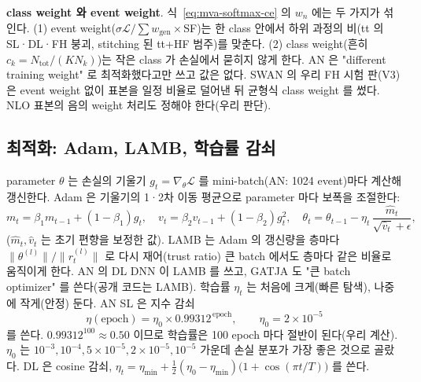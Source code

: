 \textbf{class weight 와 event weight}.\label{sec:mva-basics-weights} 식~\eqref{eq:mva-softmax-ce} 의 $w_n$ 에는 두 가지가 섞인다. (1) event weight($\sigma\mathcal{L}/\sum w_{\mathrm{gen}}\times$SF)는 한 class 안에서
하위 과정의 비(tt 의 SL·DL·FH 붕괴, stitching 된 tt+HF 범주)를 맞춘다. (2) class weight(흔히 $c_k=N_{\mathrm{tot}}/(K N_k)$)는 작은 class 가
손실에서 묻히지 않게 한다. AN 은 "different training weight" 로 최적화했다고만 쓰고 값은 없다. SWAN 의 우리 FH
시험 판(V3)은 event weight 없이 표본을 일정 비율로 덜어낸 뒤 균형식 class weight 를 썼다. NLO 표본의 음의 weight 처리도
정해야 한다(우리 판단).

\subsection{최적화: Adam, LAMB, 학습률 감쇠}\label{sec:mva-basics-opt}

parameter $\theta$ 는 손실의 기울기 $g_t=\nabla_\theta\mathcal{L}$ 를 mini-batch(AN: 1024 event)마다 계산해 갱신한다. Adam 은 기울기의 1·2차
이동 평균으로 parameter 마다 보폭을 조절한다:
\begin{equation}
  m_t=\beta_1 m_{t-1}+(1-\beta_1)g_t,\quad v_t=\beta_2 v_{t-1}+(1-\beta_2)g_t^2,\quad
  \theta_t=\theta_{t-1}-\eta_t\,\frac{\hat m_t}{\sqrt{\hat v_t}+\epsilon},
  \label{eq:mva-adam}
\end{equation}
($\hat m_t, \hat v_t$ 는 초기 편향을 보정한 값). LAMB 는 Adam 의 갱신량을 층마다 $\|\theta^{(l)}\|/\|r_t^{(l)}\|$ 로 다시 재어(trust ratio)
큰 batch 에서도 층마다 같은 비율로 움직이게 한다. AN 의 DL DNN 이 LAMB 를 쓰고, GATJA 도 "큰 batch
optimizer" 를 쓴다(공개 코드는 LAMB).
학습률 $\eta_t$ 는 처음에 크게(빠른 탐색), 나중에 작게(안정) 둔다. AN SL 은 지수 감쇠
\begin{equation}
  \eta(\text{epoch})=\eta_0\times0.99312^{\,\text{epoch}},\qquad \eta_0=2\times10^{-5}
  \label{eq:mva-lrdecay}
\end{equation}
를 쓴다. $0.99312^{100}\approx0.50$ 이므로 학습률은 100 epoch 마다 절반이 된다(우리 계산).
$\eta_0$ 는 $10^{-3}, 10^{-4}, 5\times10^{-5}, 2\times10^{-5}, 10^{-5}$ 가운데 손실 분포가 가장 좋은 것으로 골랐다.
DL 은 cosine 감쇠, $\eta_t=\eta_{\min}+\tfrac12(\eta_0-\eta_{\min})\bigl(1+\cos(\pi t/T)\bigr)$ 를 쓴다.


